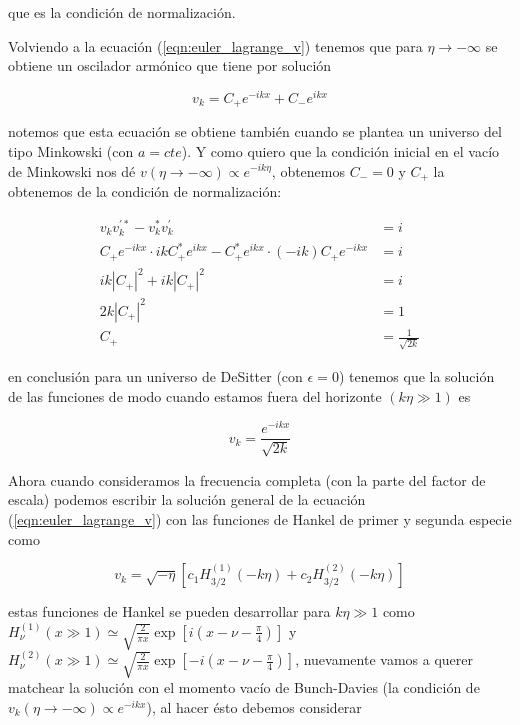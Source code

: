 \noindent
que es la condición de normalización.

Volviendo a la ecuación (\ref{eqn:euler_lagrange_v}) tenemos que para $\eta \rightarrow -\infty$ se obtiene un oscilador armónico que tiene por solución

\begin{equation}
    v_k = C_+ e^{-i k x} + C_- e^{i k x}
\end{equation}

\noindent
notemos que esta ecuación se obtiene también cuando se plantea un universo del tipo Minkowski (con $a = cte$). Y como quiero que la condición inicial en el vacío de Minkowski nos dé $\displaystyle v (\eta \rightarrow - \infty) \propto e^{- i k \eta}$, obtenemos $C_- = 0$ y $C_+$ la obtenemos de la condición de normalización:

\begin{equation*}
    \begin{split}
        v_k v^{\prime *}_k - v_k^* v_k^\prime &= i\\
        C_+ e^{-ikx} \cdot i k C_+^* e^{ikx} - C_+^* e^{i k x} \cdot (-ik) C_+ e^{-i k x} &= i\\
        i k \left| C_+ \right|^2 + i k \left| C_+ \right|^2 &= i\\
        2 k \left| C_+ \right|^2 &= 1\\
        C_+ &= \frac{1}{\sqrt{2k}}
    \end{split}
\end{equation*}

\noindent
en conclusión para un universo de DeSitter (con $\epsilon = 0$) tenemos que la solución de las funciones de modo cuando estamos fuera del horizonte $(k \eta \gg 1)$ es

\begin{equation}
    v_k = \frac{e^{-i k x}}{\sqrt{2 k}}
\end{equation}

Ahora cuando consideramos la frecuencia completa (con la parte del factor de escala) podemos escribir la solución general de la ecuación (\ref{eqn:euler_lagrange_v}) con las funciones de Hankel de primer y segunda especie como

\begin{equation}
    v_k = \sqrt{- \eta} \left[ c_1 H_{3/2}^{(1)} (-k\eta) + c_2 H_{3/2}^{(2)} (-k\eta) \right]
\end{equation}

\noindent
estas funciones de Hankel se pueden desarrollar para $k \eta \gg 1$ como $\displaystyle H_{\nu}^{(1)} (x \gg 1) \simeq \sqrt{\frac{2}{\pi x}} \exp \left[ i \left(x - \nu - \frac{\pi}{4} \right) \right]$ y $\displaystyle H_{\nu}^{(2)} (x \gg 1) \simeq \sqrt{\frac{2}{\pi x}} \exp \left[ -i \left(x - \nu - \frac{\pi}{4} \right) \right]$, nuevamente vamos a querer matchear la solución con el momento vacío de Bunch-Davies (la condición de $v_k (\eta \rightarrow -\infty) \propto e^{- i k x}$), al hacer ésto debemos considerar 


